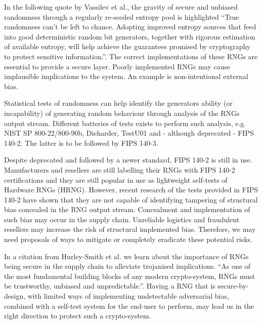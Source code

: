 \documentclass[]{final_report}
\begin{document}
\par{In the following quote by Vassilev et al.\cite{Vassilev:2014}, the gravity of secure and unbiased randomness through a regularly re-seeded entropy pool is highlighted ``True randomness can't be left to chance. Adopting improved entropy sources that feed into good deterministic random bit generators, together with rigorous estimation of available entropy, will help achieve the guarantees promised by cryptography to protect sensitive information.''. The correct implementations of these RNGs are essential to provide a secure layer. Poorly implemented RNGs may cause implausible implications to the system. An example is non-intentional external bias.}

\par{Statistical tests of randomness can help identify the generators ability (or incapability) of generating random behaviour through analysis of the RNGs output stream. Different batteries of tests exists to perform such analysis, e.g. NIST SP 800-22/800-90b, Dieharder, TestU01 and - although deprecated - FIPS 140-2. The latter is to be followed by FIPS 140-3.}

\par{Despite deprecated and followed by a newer standard, FIPS 140-2 is still in use. Manufacturers and resellers are still labelling their RNGs with FIPS 140-2 certifications and they are still popular in use as lightweight self-tests of Hardware RNGs (HRNG). However, recent research of the tests provided in FIPS 140-2 have shown that they are not capable of identifying tampering of structural bias concealed in the RNG output stream\cite{Smith:2020}. Concealment and implementation of such bias may occur in the supply chain. Unreliable logistics and fraudulent resellers may increase the risk of structural implemented bias. Therefore, we may need proposals of ways to mitigate or completely eradicate these potential risks.}

\par{In a citation from Hurley-Smith et al.\cite{Smith:2020} we learn about the importance of RNGs being secure in the supply chain to alleviate trojanised implications. ``As one of the most fundamental building blocks of any modern crypto-system, RNGs must be trustworthy, unbiased and unpredictable.''. Having a RNG that is secure-by-design, with limited ways of implementing undetectable adversarial bias, combined with a self-test system for the end-user to perform, may lead us in the right direction to protect such a crypto-system.}
\end{document}
